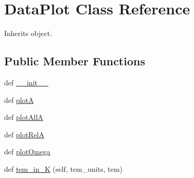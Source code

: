 \hypertarget{classpyneb_1_1plot_1_1plot_atomic_data_1_1_data_plot}{}\section{Data\+Plot Class Reference}
\label{classpyneb_1_1plot_1_1plot_atomic_data_1_1_data_plot}


Inherits object.

\subsection*{Public Member Functions}
\begin{DoxyCompactItemize}
\item 
def \hyperlink{classpyneb_1_1plot_1_1plot_atomic_data_1_1_data_plot_ac775ee34451fdfa742b318538164070e}{\+\_\+\+\_\+init\+\_\+\+\_\+}
\item 
def \hyperlink{classpyneb_1_1plot_1_1plot_atomic_data_1_1_data_plot_a5a124b4b90f3902a500c28580f06a135}{plot\+A}
\item 
def \hyperlink{classpyneb_1_1plot_1_1plot_atomic_data_1_1_data_plot_aa4c67c06f90c7e2250245b6b131dfb59}{plot\+All\+A}
\item 
def \hyperlink{classpyneb_1_1plot_1_1plot_atomic_data_1_1_data_plot_ac0a814e85d696da65c14ac123d90df84}{plot\+Rel\+A}
\item 
def \hyperlink{classpyneb_1_1plot_1_1plot_atomic_data_1_1_data_plot_afd1ca8b0bda1af295e212e79dad07e55}{plot\+Omega}
\item 
def \hyperlink{classpyneb_1_1plot_1_1plot_atomic_data_1_1_data_plot_ad28a02b4b53f79488a09fcbe46cd0fff}{tem\+\_\+in\+\_\+\+K} (self, tem\+\_\+units, tem)
\end{DoxyCompactItemize}
